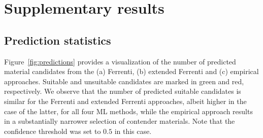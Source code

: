 \documentclass[superscriptaddress,unsortedaddress,
 amsmath,amssymb,
 aps,
]{revtex4-2}
\begin{document}






\section*{Supplementary results} 

\subsection*{Prediction statistics}

Figure~\ref{fig:predictions} provides a visualization of the number of predicted material candidates from the (a) Ferrenti, (b) extended Ferrenti and (c) empirical approaches. Suitable and unsuitable candidates are marked in green and red, respectively. We observe that the number of predicted suitable candidates is similar for the Ferrenti and extended Ferrenti approaches, albeit higher in the case of the latter, for all four ML methods, while the empirical approach results in a substantially narrower selection of contender materials. Note that the confidence threshold was set to $0.5$ in this case. 
\end{document}
